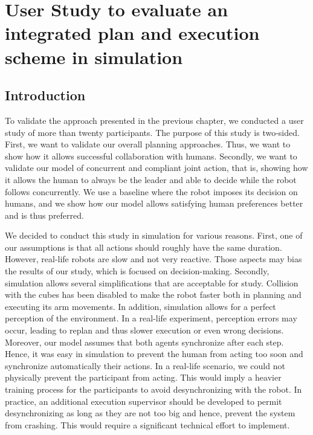\ifdefined{}
\else
\setcounter{chapter}{5} 
\dominitoc
\faketableofcontents
\fi

\chapter{User Study to evaluate an integrated plan and execution scheme in simulation}
\label{chap:6}
\minitoc


\section{Introduction}

To validate the approach presented in the previous chapter, we conducted a user study of more than twenty participants. The purpose of this study is two-sided. 
First, we want to validate our overall planning approaches. Thus, we want to show how it allows successful collaboration with humans. 
Secondly, we want to validate our model of concurrent and compliant joint action, that is, showing how it allows the human to always be the leader and able to decide while the robot follows concurrently. We use a baseline where the robot imposes its decision on humans, and we show how our model allows satisfying human preferences better and is thus preferred. 

We decided to conduct this study in simulation for various reasons. First, one of our assumptions is that all actions should roughly have the same duration. However, real-life robots are slow and not very reactive. Those aspects may bias the results of our study, which is focused on decision-making. Secondly, simulation allows several simplifications that are acceptable for study. Collision with the cubes has been disabled to make the robot faster both in planning and executing its arm movements. In addition, simulation allows for a perfect perception of the environment. In a real-life experiment, perception errors may occur, leading to replan and thus slower execution or even wrong decisions. Moreover, our model assumes that both agents synchronize after each step. Hence, it was easy in simulation to prevent the human from acting too soon and synchronize automatically their actions. In a real-life scenario, we could not physically prevent the participant from acting. This would imply a heavier training process for the participants to avoid desynchronizing with the robot. In practice, an additional execution supervisor should be developed to permit desynchronizing as long as they are not too big and hence, prevent the system from crashing. This would require a significant technical effort to implement.

